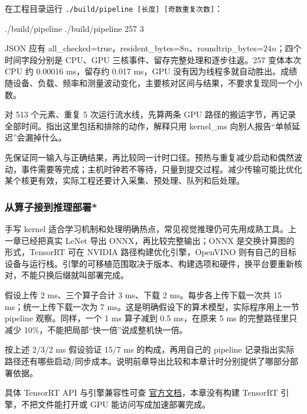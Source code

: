 \begin{cudablock}

\end{cudablock}
\begin{example}[比较同一程序的规模与传输]
在工程目录运行 \texttt{./build/pipeline [长度] [奇数重复次数]}：
\begin{tbash}
./build/pipeline
./build/pipeline 257 3
\end{tbash}
JSON 应有 all\_checked=true，resident\_bytes=$8n$、roundtrip\_bytes=$24n$；四个时间字段分别是 CPU、GPU 三核事件、留存完整处理和逐步往返。257 变体本次 CPU 约 0.00016 ms，留存约 0.017 ms，GPU 没有因为线程多就自动胜出。成绩随设备、负载、频率和测量波动变化，主要核对区间与结果，不要求复现同一个小数。
\end{example}
\begin{exercise}\label{ex:v2-cuda-timing}
对 513 个元素、重复 5 次运行流水线，先算两条 GPU 路径的搬运字节，再记录全部时间。指出这里包括和排除的动作，解释只用 kernel\_ms 向别人报告“单帧延迟”会漏掉什么。
\end{exercise}
\begin{conclusion}
先保证同一输入与正确结果，再比较同一计时口径。预热与重复减少启动和偶然波动，事件需要等完成；主机时钟若不等待，只量到提交过程。减少传输可能比优化某个核更有效，实际工程还要计入采集、预处理、队列和后处理。
\end{conclusion}

\subsubsection{从算子接到推理部署*}
手写 kernel 适合学习机制和处理明确热点，常见视觉推理仍可先用成熟工具。上一章已经把真实 LeNet 导出 ONNX，再比较完整输出；ONNX 是交换计算图的形式，TensorRT 可在 NVIDIA 路径构建优化引擎，OpenVINO 则有自己的目标设备与运行栈。引擎的可移植范围取决于版本、构建选项和硬件，换平台要重新核对，不能只换后缀就叫部署完成。
\begin{example}[用完整开销判断优化价值]
假设上传 2 ms、三个算子合计 3 ms、下载 2 ms。每步各上传下载一次共 15 ms；统一上传下载一次为 7 ms。这是明确假设下的算术模型，实际程序用上一节 pipeline 观察。同样，一个 1 ms 算子减到 0.5 ms，在原来 5 ms 的完整路径里只减少 10\%，不能把局部“快一倍”说成整机快一倍。
\end{example}
\begin{exercise}\label{ex:v2-cuda-deploy}
按上述 2/3/2 ms 假设验证 15/7 ms 的构成，再用自己的 pipeline 记录指出实际路径还有哪些启动/同步成本。说明前章导出比较和本章计时分别提供了哪部分部署依据。
\end{exercise}
具体 TensorRT API 与引擎兼容性可查 \href{https://docs.nvidia.com/deeplearning/tensorrt/}{官方文档}，本章没有构建 TensorRT 引擎，不把文件能打开或 GPU 能访问写成加速部署完成。

